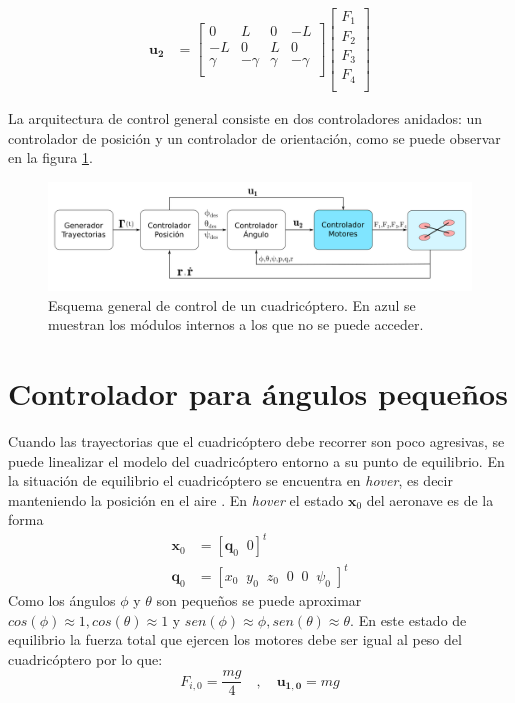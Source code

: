 \begin{align}
	\mathbf{u_2}  &= \begin{bmatrix}
		0&L&0&-L\\
		-L&0&L&0\\
		\gamma&-\gamma&\gamma&-\gamma\\
	\end{bmatrix}\begin{bmatrix} F_1\\ 
	F_2\\ 
	F_3\\ 
	F_4\\ 
\end{bmatrix}\label{eq:u2}
\end{align} 

La arquitectura de control general consiste en dos controladores anidados: un controlador de posición y un controlador de orientación, como se puede observar en la figura \ref{control:1}.



\begin{figure}[htb!]
	\centering
	\includegraphics[width=\textwidth]{imagenes/diagramaControl1}
	\caption{Esquema general de control de un cuadricóptero. En azul se muestran los módulos internos a los que no se puede acceder. }
	\label{control:1}
\end{figure}


\section{Controlador para ángulos pequeños}
Cuando las trayectorias que el cuadricóptero debe recorrer son poco agresivas, se puede linealizar el modelo del cuadricóptero entorno a su punto de equilibrio. En la situación de equilibrio el cuadricóptero se encuentra en \textit{hover}, es decir manteniendo la posición en el aire . En \textit{hover} el estado $\mathbf{x}_0$ del aeronave es de la forma 
\begin{align}
	\mathbf{x}_0 &= [\mathbf{q}_0 \;\; 0]^t\nonumber\\
	\mathbf{q}_0 &= [x_0  \;\;y_0  \;\;z_0  \;\;0  \;\;0  \;\;\psi_0  \;]^t
\end{align}
Como los ángulos $\phi$ y $\theta$ son pequeños se puede aproximar $cos(\phi) \approx 1 , cos(\theta) \approx 1$ y $sen(\phi) \approx \phi , sen(\theta) \approx \theta$. En este estado de equilibrio la fuerza total que ejercen los motores debe ser igual al peso del cuadricóptero por lo que:
\begin{equation}
	F_{i,0}  = \frac{mg}{4}\quad,\quad \mathbf{u_{1,0}} = mg
\end{equation}

